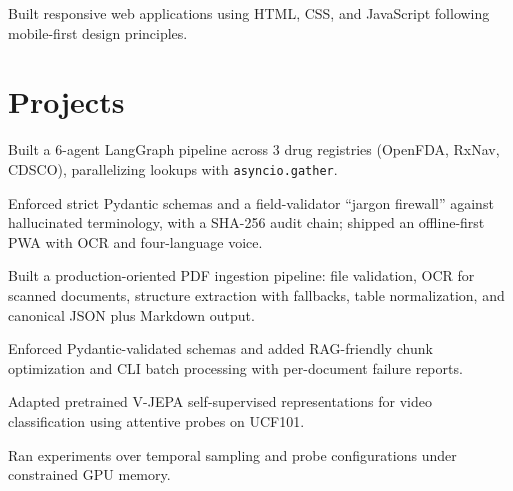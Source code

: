 \documentclass[a4paper,10pt]{article}
\begin{document}
\begin{points}
  \item Built responsive web applications using HTML, CSS, and JavaScript following mobile-first design principles.
\end{points}

\section{Projects}

\begin{points}
  \item Built a 6-agent LangGraph pipeline across 3 drug registries (OpenFDA, RxNav, CDSCO), parallelizing lookups with \texttt{asyncio.gather}.
  \item Enforced strict Pydantic schemas and a field-validator ``jargon firewall'' against hallucinated terminology, with a SHA-256 audit chain; shipped an offline-first PWA with OCR and four-language voice.
\end{points}
\gap

\begin{points}
  \item Built a production-oriented PDF ingestion pipeline: file validation, OCR for scanned documents, structure extraction with fallbacks, table normalization, and canonical JSON plus Markdown output.
  \item Enforced Pydantic-validated schemas and added RAG-friendly chunk optimization and CLI batch processing with per-document failure reports.
\end{points}
\gap

\begin{points}
  \item Adapted pretrained V-JEPA self-supervised representations for video classification using attentive probes on UCF101.
  \item Ran experiments over temporal sampling and probe configurations under constrained GPU memory.
\end{points}
\gap
\end{document}
